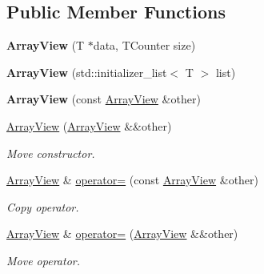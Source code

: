 \subsection*{Public Member Functions}
\begin{DoxyCompactItemize}
\item 
\hypertarget{classArrayView_aa48aec8978420bc5a9d6d99f8c0f5d89}{}\label{classArrayView_aa48aec8978420bc5a9d6d99f8c0f5d89} 
{\bfseries Array\+View} (T $\ast$data, T\+Counter size)
\item 
\hypertarget{classArrayView_a4698fee2b1061a1566c8c46dccb799bb}{}\label{classArrayView_a4698fee2b1061a1566c8c46dccb799bb} 
{\bfseries Array\+View} (std\+::initializer\+\_\+list$<$ T $>$ list)
\item 
\hypertarget{classArrayView_a67c0cd88e7a636210f9a9be2f1a23cd4}{}\label{classArrayView_a67c0cd88e7a636210f9a9be2f1a23cd4} 
{\bfseries Array\+View} (const \hyperlink{classArrayView}{Array\+View} \&other)
\item 
\hypertarget{classArrayView_a43488b273e526426af792e81769d98e6}{}\label{classArrayView_a43488b273e526426af792e81769d98e6} 
\hyperlink{classArrayView_a43488b273e526426af792e81769d98e6}{Array\+View} (\hyperlink{classArrayView}{Array\+View} \&\&other)
\begin{DoxyCompactList}\small\item\em Move constructor. \end{DoxyCompactList}\item 
\hypertarget{classArrayView_a10028583b4df8d21bb2b411aa12dc698}{}\label{classArrayView_a10028583b4df8d21bb2b411aa12dc698} 
\hyperlink{classArrayView}{Array\+View} \& \hyperlink{classArrayView_a10028583b4df8d21bb2b411aa12dc698}{operator=} (const \hyperlink{classArrayView}{Array\+View} \&other)
\begin{DoxyCompactList}\small\item\em Copy operator. \end{DoxyCompactList}\item 
\hypertarget{classArrayView_aae5ed0dd43b799f8d1f6f7d794cc4715}{}\label{classArrayView_aae5ed0dd43b799f8d1f6f7d794cc4715} 
\hyperlink{classArrayView}{Array\+View} \& \hyperlink{classArrayView_aae5ed0dd43b799f8d1f6f7d794cc4715}{operator=} (\hyperlink{classArrayView}{Array\+View} \&\&other)
\begin{DoxyCompactList}\small\item\em Move operator. \end{DoxyCompactList}\item 
\hypertarget{classArrayView_a9ce305091383c594f125c8cf312c6bf6}{}\label{classArrayView_a9ce305091383c594f125c8cf312c6bf6} 

\end{DoxyCompactItemize}
